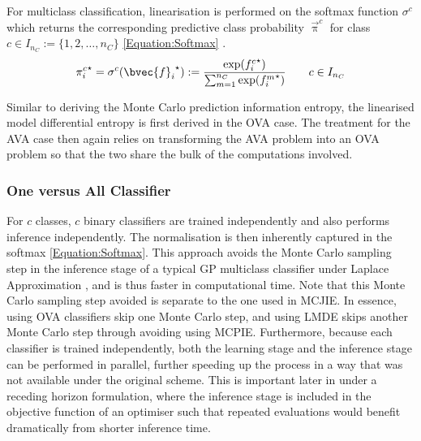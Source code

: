 			For multiclass classification, linearisation is performed on the softmax function $\sigma^{c}$ which returns the corresponding predictive class probability $\vec{\uppi}^{c}$ for class $c \in I_{n_{C}} := \{1, 2, \dots, n_{C}\}$ \eqref{Equation:Softmax} \citep{GaussianProcessForMachineLearning}. \begin{equation}
				{\pi^{c}_{i}}^{\star} = \sigma^{c}({\bvec{f}_{i}}^{\star}) := \frac{\exp({f^{c}_{i}}^{\star})}{\sum_{m = 1}^{n_{C}} \exp({f^{m}_{i}}^{\star})} \qquad c \in I_{n_{C}}
			\label{Equation:Softmax}
			\end{equation}
			
			Similar to deriving the Monte Carlo prediction information entropy, the linearised model differential entropy is first derived in the OVA case. The treatment for the AVA case then again relies on transforming the AVA problem into an OVA problem so that the two share the bulk of the computations involved.
			
			\subsubsection{One versus All Classifier}
			\label{InformativeSeafloorExploration:LMDE:Multiclass:OVA}
			
				For $c$ classes, $c$ binary classifiers are trained independently and also performs inference independently. The normalisation is then inherently captured in the softmax \eqref{Equation:Softmax}. This approach avoids the Monte Carlo sampling step in the inference stage of a typical GP multiclass classifier under Laplace Approximation \citep{GaussianProcessForMachineLearning}, and is thus faster in computational time. Note that this Monte Carlo sampling step avoided is separate to the one used in MCJIE. In essence, using OVA classifiers skip one Monte Carlo step, and using LMDE skips another Monte Carlo step through avoiding using MCPIE. Furthermore, because each classifier is trained independently, both the learning stage and the inference stage can be performed in parallel, further speeding up the process in a way that was not available under the original scheme. This is important later in under a receding horizon formulation, where the inference stage is included in the objective function of an optimiser such that repeated evaluations would benefit dramatically from shorter inference time.
				

